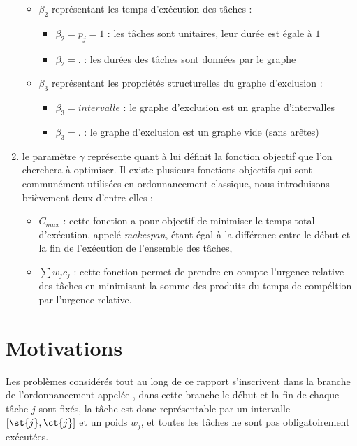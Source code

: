 \documentclass[a4paper,11pt]{report}
\begin{document}
\begin{enumerate}
\begin{itemize}[label=$\bullet$]
\begin{itemize}
                \end{itemize}
            \item $\beta_2$ représentant les temps d'exécution des tâches :
                \begin{itemize}
                    \item $\beta_2 = p_j = 1$ : les tâches sont unitaires, leur durée est égale à
                        $1$
                    \item $\beta_2 = .$ : les durées des tâches sont données par le graphe
                \end{itemize}
            \item $\beta_3$ représentant les propriétés structurelles du graphe d'exclusion :
                \begin{itemize}
                    \item \textbf{$\beta_3 = intervalle$} : le graphe d'exclusion est un graphe d'intervalles
                    \item $\beta_3 = .$ : le graphe d'exclusion est un graphe vide (sans arêtes)
                \end{itemize}
        \end{itemize}
    \item le paramètre $\gamma$ représente quant à lui définit la fonction objectif que l'on
        cherchera à optimiser. Il existe plusieurs fonctions objectifs qui sont communément
        utilisées en ordonnancement classique, nous introduisons brièvement deux d'entre elles :
        \begin{itemize}
            \item $C_{max}$ : cette fonction a pour objectif de minimiser le temps total d'exécution,
                appelé \emph{makespan}, étant égal à la différence entre le début et la fin de
                l'exécution de l'ensemble des tâches,
            \item $\sum w_j c_j$ : cette fonction permet de prendre en compte l'urgence relative des
                tâches en minimisant la somme des produits du temps de compéltion par l'urgence
                relative.
        \end{itemize}
\end{enumerate}

\section{Motivations}

Les problèmes considérés tout au long de ce rapport s'inscrivent dans la branche de l'ordonnancement
appelée \isched{}, dans cette branche le début et la fin de chaque tâche $j$ sont
fixés, la tâche est donc représentable par un intervalle $\left[ \st{j}, \ct{j} \right]$ et un poids
$w_j$, et toutes les tâches ne sont pas obligatoirement exécutées.
\end{document}
